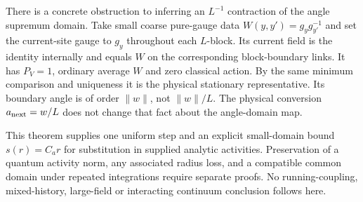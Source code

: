 There is a concrete obstruction to inferring an $L^{-1}$ contraction
of the angle supremum domain. Take small coarse pure-gauge data
$W(y,y')=g_yg_{y'}^{-1}$ and set the current-site gauge to $g_y$
throughout each $L$-block. Its current field is the identity internally
and equals $W$ on the corresponding block-boundary links. It has
$P_V=1$, ordinary average $W$ and zero classical action. By the same
minimum comparison and uniqueness it is the physical stationary
representative. Its boundary angle is of order $\|w\|$, not
$\|w\|/L$. The physical conversion $a_{\rm next}=w/L$ does not change
that fact about the angle-domain map.

This theorem supplies one uniform step and an explicit small-domain
bound $s(r)=C_ar$ for substitution in supplied analytic activities.
Preservation of a quantum activity norm, any associated radius loss,
and a compatible common domain under repeated integrations require
separate proofs. No running-coupling, mixed-history, large-field or
interacting continuum conclusion follows here.
